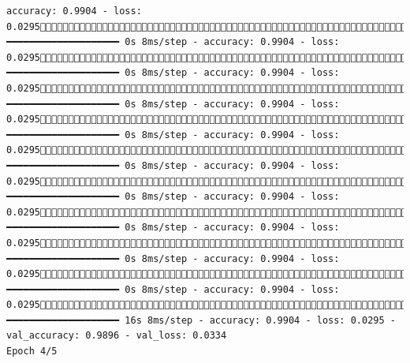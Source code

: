 \documentclass[
  letterpaper,
  DIV=11,
  numbers=noendperiod]{scrreprt}
\begin{document}
\begin{verbatim}
accuracy: 0.9904 - loss: 0.02951820/1875 ━━━━━━━━━━━━━━━━━━━━ 0s 8ms/step - accuracy: 0.9904 - loss: 0.02951827/1875 ━━━━━━━━━━━━━━━━━━━━ 0s 8ms/step - accuracy: 0.9904 - loss: 0.02951833/1875 ━━━━━━━━━━━━━━━━━━━━ 0s 8ms/step - accuracy: 0.9904 - loss: 0.02951840/1875 ━━━━━━━━━━━━━━━━━━━━ 0s 8ms/step - accuracy: 0.9904 - loss: 0.02951846/1875 ━━━━━━━━━━━━━━━━━━━━ 0s 8ms/step - accuracy: 0.9904 - loss: 0.02951853/1875 ━━━━━━━━━━━━━━━━━━━━ 0s 8ms/step - accuracy: 0.9904 - loss: 0.02951860/1875 ━━━━━━━━━━━━━━━━━━━━ 0s 8ms/step - accuracy: 0.9904 - loss: 0.02951867/1875 ━━━━━━━━━━━━━━━━━━━━ 0s 8ms/step - accuracy: 0.9904 - loss: 0.02951874/1875 ━━━━━━━━━━━━━━━━━━━━ 0s 8ms/step - accuracy: 0.9904 - loss: 0.02951875/1875 ━━━━━━━━━━━━━━━━━━━━ 16s 8ms/step - accuracy: 0.9904 - loss: 0.0295 - val_accuracy: 0.9896 - val_loss: 0.0334
Epoch 4/5

\end{verbatim}
\end{document}
